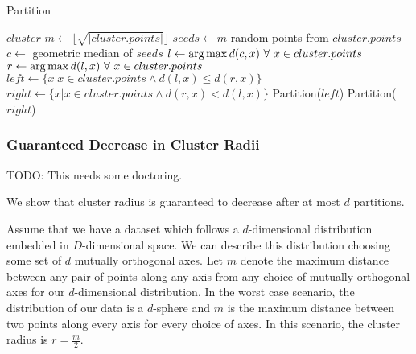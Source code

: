\begin{algorithm} %
\caption{Partition} %
\label{alg:partition} %
\begin{algorithmic}[1] %
    \REQUIRE $cluster$
    \STATE $m \leftarrow \lfloor \sqrt{|cluster.points|} \rfloor$
    \STATE $seeds \leftarrow m$ random points from $cluster.points$
    \STATE $c \leftarrow$ geometric median of $seeds$
    \STATE $l \leftarrow \operatorname*{arg\,max} d(c,x) \ \forall \ x \in cluster.points$
    \STATE $r \leftarrow \operatorname*{arg\,max} d(l,x) \ \forall \ x \in cluster.points$
    \STATE $left \leftarrow \{x | x \in cluster.points \land d(l,x) \le d(r,x)\}$
    \STATE $right \leftarrow \{x | x \in cluster.points \land d(r,x) < d(l,x)\}$
        \STATE Partition($left$)
    \ENDIF
        \STATE Partition($right$)
    \ENDIF
\end{algorithmic}
\end{algorithm}

\subsubsection {Guaranteed Decrease in Cluster Radii}
\label{subsubsec:methods:guaranteed-decrease-in-cluster-radii}

TODO: This needs some doctoring. 

We show that cluster radius is guaranteed to decrease after at most $d$ partitions.

Assume that we have a dataset which follows a $d$-dimensional distribution embedded in $D$-dimensional space.
We can describe this distribution choosing some set of $d$ mutually orthogonal axes.
Let $m$ denote the maximum distance between any pair of points along any axis from any choice of mutually orthogonal axes for our $d$-dimensional distribution.
In the worst case scenario, the distribution of our data is a $d$-sphere and $m$ is the maximum distance between two points along every axis for every choice of axes.
In this scenario, the cluster radius is $r = \frac{m}{2}$.


